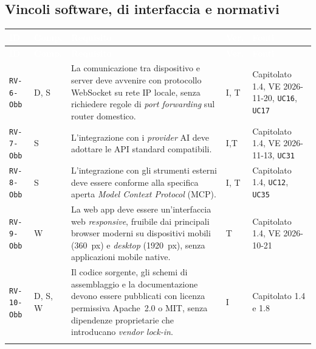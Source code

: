 \documentclass[12pt,a4paper]{article}
\newcommand{\thc}[1]{\textcolor{white}{\textbf{#1}}}
\newcommand{\rl}{\\ \arrayrulecolor{bfline}\hline}
\begin{document}
\subsection{Vincoli software, di interfaccia e normativi}
\begin{longtable}{>{\raggedright\arraybackslash}p{}>{\centering\arraybackslash}p{}>{\raggedright\arraybackslash}p{}>{\centering\arraybackslash}p{}>{\raggedright\arraybackslash}p{}}
\rowcolor{bfblue}\thc{ID} & \thc{Comp.} & \thc{Requisito} & \thc{Ver.} & \thc{Fonti} \\ \endfirsthead
\rowcolor{bfblue}\thc{ID} & \thc{Comp.} & \thc{Requisito} & \thc{Ver.} & \thc{Fonti} \\ \endhead
\texttt{RV-6-Obb} & D, S & La comunicazione tra dispositivo e server deve avvenire con protocollo WebSocket su rete IP locale, senza richiedere regole di \emph{port forwarding} sul router domestico. & I, T & Capitolato 1.4, VE 2026-11-20, \texttt{UC16}, \texttt{UC17} \rl

\texttt{RV-7-Obb} & S & L'integrazione con i \emph{provider} AI deve adottare le API standard compatibili.&I,T&Capitolato 1.4, VE 2026-11-13, \texttt{UC31} \rl

\texttt{RV-8-Obb} & S & L'integrazione con gli strumenti esterni deve essere conforme alla specifica aperta \emph{Model Context Protocol} (MCP). & I, T & Capitolato 1.4, \texttt{UC12}, \texttt{UC35} \rl

\texttt{RV-9-Obb} & W & La web app deve essere un'interfaccia web \emph{responsive}, fruibile dai principali browser moderni su dispositivi mobili (360~px) e \emph{desktop} (1920~px), senza applicazioni mobile native. & T & Capitolato 1.4, VE 2026-10-21 \rl

\texttt{RV-10-Obb} & D, S, W & Il codice sorgente, gli schemi di assemblaggio e la documentazione devono essere pubblicati con licenza permissiva Apache~2.0 o MIT, senza dipendenze proprietarie che introducano \emph{vendor lock-in}. & I & Capitolato 1.4 e 1.8 \rl

\end{longtable}
\end{document}
